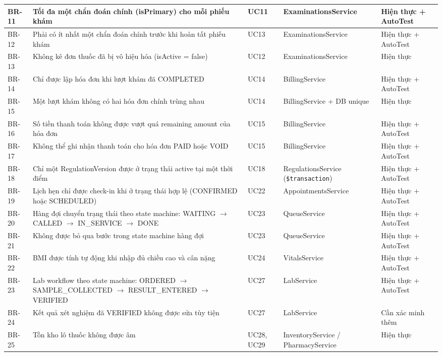 \begin{longtable}{|p{1.3cm}|p{4.5cm}|p{2.0cm}|p{2.4cm}|p{2.2cm}|}
\hline
BR-11 & Tối đa một chẩn đoán chính (isPrimary) cho mỗi phiếu khám & UC11 & ExaminationsService & Hiện thực + AutoTest \\
\hline
BR-12 & Phải có ít nhất một chẩn đoán chính trước khi hoàn tất phiếu khám & UC13 & ExaminationsService & Hiện thực + AutoTest \\
\hline
BR-13 & Không kê đơn thuốc đã bị vô hiệu hóa (isActive = false) & UC12 & ExaminationsService & Hiện thực \\
\hline
BR-14 & Chỉ được lập hóa đơn khi lượt khám đã COMPLETED & UC14 & BillingService & Hiện thực + AutoTest \\
\hline
BR-15 & Một lượt khám không có hai hóa đơn chính trùng nhau & UC14 & BillingService + DB unique & Hiện thực \\
\hline
BR-16 & Số tiền thanh toán không được vượt quá remaining amount của hóa đơn & UC15 & BillingService & Hiện thực + AutoTest \\
\hline
BR-17 & Không thể ghi nhận thanh toán cho hóa đơn PAID hoặc VOID & UC15 & BillingService & Hiện thực + AutoTest \\
\hline
BR-18 & Chỉ một RegulationVersion được ở trạng thái active tại một thời điểm & UC18 & RegulationsService (\verb|$transaction|) & Hiện thực + AutoTest \\
\hline
BR-19 & Lịch hẹn chỉ được check-in khi ở trạng thái hợp lệ (CONFIRMED hoặc SCHEDULED) & UC22 & AppointmentsService & Hiện thực + AutoTest \\
\hline
BR-20 & Hàng đợi chuyển trạng thái theo state machine: WAITING $\rightarrow$ CALLED $\rightarrow$ IN\_SERVICE $\rightarrow$ DONE & UC23 & QueueService & Hiện thực + AutoTest \\
\hline
BR-21 & Không được bỏ qua bước trong state machine hàng đợi & UC23 & QueueService & Hiện thực + AutoTest \\
\hline
BR-22 & BMI được tính tự động khi nhập đủ chiều cao và cân nặng & UC24 & VitalsService & Hiện thực + AutoTest \\
\hline
BR-23 & Lab workflow theo state machine: ORDERED $\rightarrow$ SAMPLE\_COLLECTED $\rightarrow$ RESULT\_ENTERED $\rightarrow$ VERIFIED & UC27 & LabService & Hiện thực + AutoTest \\
\hline
BR-24 & Kết quả xét nghiệm đã VERIFIED không được sửa tùy tiện & UC27 & LabService & Cần xác minh thêm \\
\hline
BR-25 & Tồn kho lô thuốc không được âm & UC28, UC29 & InventoryService / PharmacyService & Hiện thực \\

\end{longtable}
